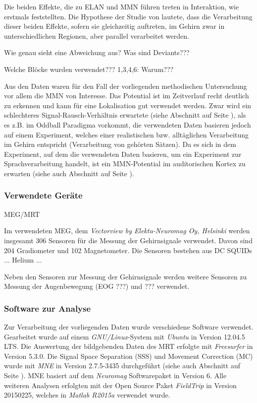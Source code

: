 \documentclass[doc,a4paper,12pt]{apa6}
\makeatletter
\DeclareRobustCommand*{\nameref}[1]{%
      \glqq{\myorg@nameref{#1}}\grqq%
    }%
\makeatother
\begin{document}
Die beiden Effekte, die zu ELAN und MMN führen treten in Interaktion, wie \textcite{hahne2002differential} erstmals feststellten. Die Hypothese der Studie von \textcite{herrmann2011syntactic} lautete, dass die Verarbeitung dieser beiden Effekte, sofern sie gleichzeitig auftreten, im Gehirn zwar in unterschiedlichen Regionen, aber parallel verarbeitet werden.

Wie genau sieht eine Abweichung aus? Was sind Deviants???

Welche Blöcke wurden verwendet??? 1,3,4,6: Warum???

Aus den Daten waren für den Fall der vorliegenden methodischen Untersuchung vor allem die MMN von Interesse. Das Potential ist im Zeitverlauf recht deutlich zu erkennen und kann für eine Lokalisation gut verwendet werden. Zwar wird ein schlechteres Signal-Rausch-Verhältnis erwartete (siehe Abschnitt \nameref{sec:snr} auf Seite \pageref{sec:snr}), als es z.B. im Oddball Paradigma \parencite{naatanen2004mismatch} vorkommt, die verwendeten Daten basieren jedoch auf einem Experiment, welches einer realistischen bzw. alltäglichen Verarbeitung im Gehirn entspricht (Verarbeitung von gehörten Sätzen). Da es sich in dem Experiment, auf dem die verwendeten Daten basieren, um ein Experiment zur Sprachverarbeitung handelt, ist ein MMN-Potential im auditorischen Kortex zu erwarten (siehe auch Abschnitt \nameref{sec:audicort} auf Seite \pageref{sec:audicort}).

\subsubsection{Verwendete Geräte}

MEG/MRT

Im verwendeten MEG, dem \emph{Vectorview by Elekta-Neuromag Oy, Helsinki} werden insgesamt 306 Sensoren für die Messung der Gehirnsignale verwendet. Davon sind 204 Gradiometer und 102 Magnetometer. Die Sensoren bestehen aus DC SQUIDs ... Helium ...

Neben den Sensoren zur Messung der Gehirnsignale werden weitere Sensoren zu Messung der Augenbewegung (EOG ???) und ??? verwendet.

\subsubsection{Software zur Analyse}
\label{sec:software}

Zur Verarbeitung der vorliegenden Daten wurde verschiedene Software verwendet. Gearbeitet wurde auf einem \emph{GNU/Linux}-System mit \emph{Ubuntu} in Version 12.04.5 LTS. Die Auswertung der bildgebenden Daten des MRT erfolgte mit \emph{Freesurfer} in Version 5.3.0. Die Signal Space Separation (SSS) und Movement Correction (MC) wurde mit \emph{MNE} in Version 2.7.5-3435 durchgeführt (siehe auch Abschnitt \nameref{sec:maxfilter} auf Seite \pageref{sec:maxfilter}). MNE basiert auf dem \emph{Neuromag} Softwarepaket in Version 6. Alle weiteren Analysen erfolgten mit der Open Source Paket \emph{FieldTrip} in Version 20150225, welches in \emph{Matlab R2015a} verwendet wurde.
\end{document}

